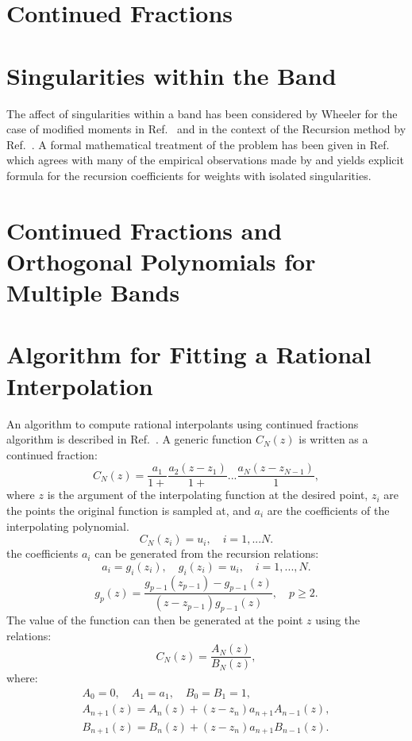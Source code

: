 \section{Continued Fractions}

\section{Singularities within the Band}
The affect of singularities within a band has 
been considered by Wheeler for the case of modified moments in
Ref.~\cite{wheeler74} and in the context of the Recursion method by Ref.~\cite{hodges77}.
A formal mathematical treatment of the problem has been given in Ref.~\cite{vanlessen03} which
agrees with many of the empirical observations made by and yields explicit formula
for the recursion coefficients for weights with isolated singularities.


\section{Continued Fractions and Orthogonal Polynomials for Multiple Bands}


\section{Algorithm for Fitting a Rational Interpolation}
\label{app:ratint}
An algorithm to compute rational interpolants 
using continued fractions algorithm is described in Ref.~\cite{vidbergserene77}.
A generic function $C_N(z)$ is written as a continued fraction:
%
\begin{equation}
C_{N}(z) = \frac{a_{1}}{1+}\frac{a_{2}(z-z_{1})}{1+}...\frac{a_{N}(z-z_{N-1})}{1},
\end{equation}
%
where $z$ is the argument of the interpolating function
at the desired point, $z_{i}$ are the points the original function is sampled at,
and $a_{i}$ are the coefficients of the interpolating polynomial.
%
\begin{equation}
C_{N}(z_{i}) = u_{i}, \quad i=1,...N.
\end{equation}
%
the coefficients $a_{i}$ can be generated from the recursion relations:
%
\begin{equation}
a_{i} = g_{i}(z_{i}),\quad g_{i}(z_{i})=u_{i},\quad i=1,...,N.
\end{equation}
%
\begin{equation}
g_{p}(z) = \frac{g_{p-1}(z_{p-1}) - g_{p-1}(z)}{(z - z_{p-1})g_{p-1}(z)}, \quad p \geq 2.
\end{equation}
%
The value of the function can then be generated at the point $z$ using the relations:
%
\begin{equation}
C_{N}(z) = \frac{A_{N}(z)}{B_{N}(z)},
\end{equation}
%
where:
%
\begin{eqnarray}
A_{0}=0, \quad A_{1} = a_{1}, \quad B_{0}=B_{1}=1, \nonumber \\
A_{n+1}(z) = A_{n}(z) + (z-z_{n})a_{n+1}A_{n-1}(z), \nonumber \\
B_{n+1}(z) = B_{n}(z) + (z-z_{n})a_{n+1}B_{n-1}(z).
\end{eqnarray}


